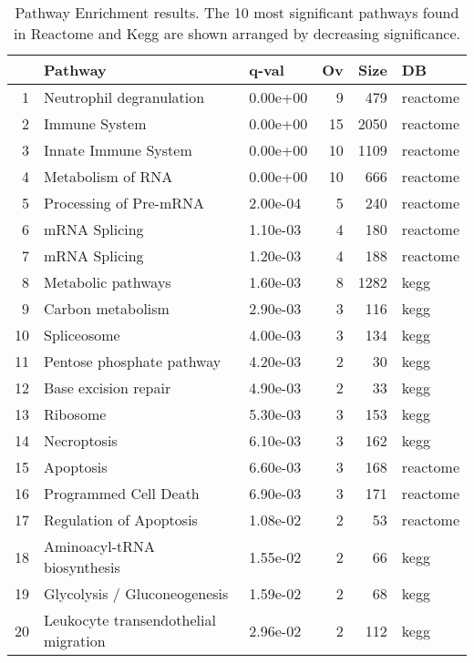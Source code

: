 \begin{table}[ht]
\centering
\begin{tabular}{rllrrl}
  \hline
 & Pathway & q-val & Ov & Size & DB \\ 
  \hline
1 & Neutrophil degranulation & 0.00e+00 &   9 & 479 & reactome \\ 
  2 & Immune System & 0.00e+00 &  15 & 2050 & reactome \\ 
  3 & Innate Immune System & 0.00e+00 &  10 & 1109 & reactome \\ 
  4 & Metabolism of RNA & 0.00e+00 &  10 & 666 & reactome \\ 
  5 & Processing of Pre-mRNA & 2.00e-04 &   5 & 240 & reactome \\ 
  6 & mRNA Splicing & 1.10e-03 &   4 & 180 & reactome \\ 
  7 & mRNA Splicing & 1.20e-03 &   4 & 188 & reactome \\ 
  8 & Metabolic pathways & 1.60e-03 &   8 & 1282 & kegg \\ 
  9 & Carbon metabolism & 2.90e-03 &   3 & 116 & kegg \\ 
  10 & Spliceosome & 4.00e-03 &   3 & 134 & kegg \\ 
  11 & Pentose phosphate pathway & 4.20e-03 &   2 &  30 & kegg \\ 
  12 & Base excision repair & 4.90e-03 &   2 &  33 & kegg \\ 
  13 & Ribosome & 5.30e-03 &   3 & 153 & kegg \\ 
  14 & Necroptosis & 6.10e-03 &   3 & 162 & kegg \\ 
  15 & Apoptosis & 6.60e-03 &   3 & 168 & reactome \\ 
  16 & Programmed Cell Death & 6.90e-03 &   3 & 171 & reactome \\ 
  17 & Regulation of Apoptosis & 1.08e-02 &   2 &  53 & reactome \\ 
  18 & Aminoacyl-tRNA biosynthesis & 1.55e-02 &   2 &  66 & kegg \\ 
  19 & Glycolysis / Gluconeogenesis & 1.59e-02 &   2 &  68 & kegg \\ 
  20 & Leukocyte transendothelial migration & 2.96e-02 &   2 & 112 & kegg \\ 
   \hline
\end{tabular}
\caption{Pathway Enrichment results. The 10 most significant pathways found in Reactome and Kegg are shown arranged by decreasing significance. }
\label{tab:pathway_enrichment}
\end{table}

